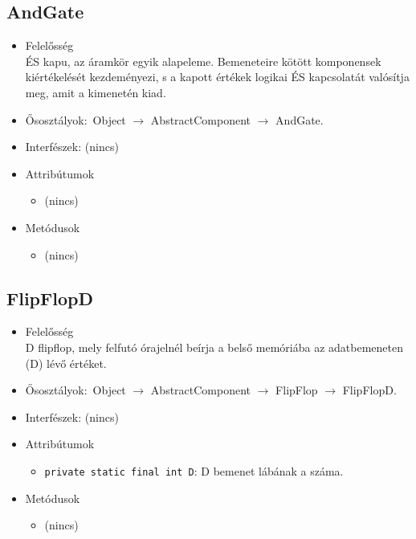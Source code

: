 \subsection{AndGate}
\begin{itemize}
\item Felelősség\\
ÉS kapu, az áramkör egyik alapeleme. Bemeneteire kötött komponensek  kiértékelését kezdeményezi, s a kapott értékek logikai ÉS kapcsolatát  valósítja meg, amit a kimenetén kiad.
\item Ősosztályok:\ Object $\rightarrow{}$ AbstractComponent $\rightarrow{}$ AndGate.
\item Interfészek: (nincs)
\item Attribútumok $\ $
\begin{itemize}
\item (nincs)
\end{itemize}
\item Metódusok$\ $
\begin{itemize}
\item (nincs)
\end{itemize}
\end{itemize}

\subsection{FlipFlopD}
\begin{itemize}
\item Felelősség\\
D flipflop, mely felfutó órajelnél beírja a belső memóriába az adatbemeneten (D)  lévő értéket.
\item Ősosztályok:\ Object $\rightarrow{}$ AbstractComponent $\rightarrow{}$ FlipFlop $\rightarrow{}$ FlipFlopD.
\item Interfészek: (nincs)
\item Attribútumok $\ $
\begin{itemize}
	\item \texttt{private static final int D}: D bemenet lábának a száma.
\end{itemize}
\item Metódusok$\ $
\begin{itemize}
\item (nincs)
\end{itemize}
\end{itemize}

